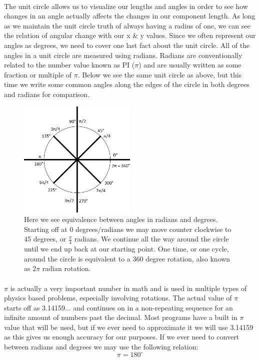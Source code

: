\documentclass[12pt, letterpaper]{report}
\begin{document}
	\paragraph{} The unit circle allows us to visualize our lengths and angles in order to see how changes in an angle actually affects the changes in our component length. As long as we maintain the unit circle truth of always having a radius of one, we can see the relation of angular change with our x \& y values. Since we often represent our angles as degrees, we need to cover one last fact about the unit circle. All of the angles in a unit circle are measured using radians. Radians are conventionally related to the number value known as PI ($\pi$) and are usually written as some fraction or multiple of $\pi$. Below we see the same unit circle as above, but this time we write some common angles along the edges of the circle in both degrees and radians for comparison.
	\begin{figure}[ht]
	\centering
	\includegraphics[width=0.5\textwidth]{Processing Images/UnitCircleRadians/UnitCircleRadians.jpg}
	\caption{Here we see equivalence between angles in radians and degrees. Starting off at 0 degrees/radians we may move counter clockwise to 45 degrees, or $\frac{\pi}{4}$ radians. We continue all the way around the circle until we end up back at our starting point. One time, or one cycle, around the circle is equivalent to a 360 degree rotation, also known as $2\pi$ radian rotation.}
	\end{figure}
	\paragraph{} $\pi$ is actually a very important number in math and is used in multiple types of physics based problems, especially involving rotations. The actual value of $\pi$ starts off as 3.14159... and continues on in a non-repeating sequence for an infinite amount of numbers past the decimal. Most programs have a built in $\pi$ value that will be used, but if we ever need to approximate it we will use 3.14159 as this gives us enough accuracy for our purposes. If we ever need to convert between radians and degrees we may use the following relation: 
	\begin{equation*}
	\pi = 180^{\circ}
	\end{equation*}
\end{document}
